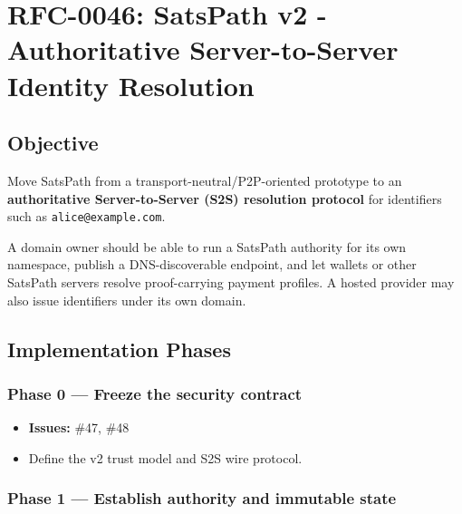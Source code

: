 \documentclass[
]{article}
\author{}
\date{}
\providecommand{\tightlist}{%
  \setlength{\itemsep}{0pt}\setlength{\parskip}{0pt}}
\begin{document}
\hypertarget{rfc-0046-satspath-v2---authoritative-server-to-server-identity-resolution}{%
\section{RFC-0046: SatsPath v2 - Authoritative Server-to-Server Identity
Resolution}\label{rfc-0046-satspath-v2---authoritative-server-to-server-identity-resolution}}

\hypertarget{objective}{%
\subsection{Objective}\label{objective}}

Move SatsPath from a transport-neutral/P2P-oriented prototype to an
\textbf{authoritative Server-to-Server (S2S) resolution protocol} for
identifiers such as \texttt{alice@example.com}.

A domain owner should be able to run a SatsPath authority for its own
namespace, publish a DNS-discoverable endpoint, and let wallets or other
SatsPath servers resolve proof-carrying payment profiles. A hosted
provider may also issue identifiers under its own domain.

\hypertarget{implementation-phases}{%
\subsection{Implementation Phases}\label{implementation-phases}}

\hypertarget{phase-0-freeze-the-security-contract}{%
\subsubsection{Phase 0 --- Freeze the security
contract}\label{phase-0-freeze-the-security-contract}}

\begin{itemize}
\tightlist
\item
  \textbf{Issues:} \#47, \#48
\item
  Define the v2 trust model and S2S wire protocol.
\end{itemize}

\hypertarget{phase-1-establish-authority-and-immutable-state}{%
\subsubsection{Phase 1 --- Establish authority and immutable
state}\label{phase-1-establish-authority-and-immutable-state}}
\end{document}
